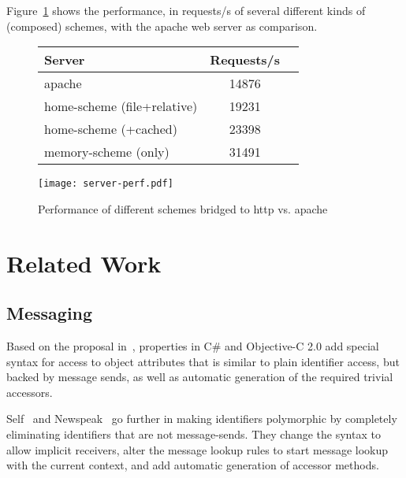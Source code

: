 \documentclass[preprint,authoryear]{llncs}
\begin{document}
Figure~\ref{http-server-speed} shows the performance, in requests/s of several different kinds of (composed)
schemes, with the apache web server as comparison.  

\begin{figure}
\begin{minipage}[c]{0.58\textwidth}
\begin{tabular}{|l|c|c|} \hline
Server   &  Requests/s    \\ \hline
apache & 	14876	      \\ %
home-scheme (file+relative) &  19231   \\ %
home-scheme (+cached)  &  23398  \\ %
memory-scheme (only) &  31491  \\ \hline
\end{tabular}
\end{minipage}
\begin{minipage}[c]{0.58\textwidth}
\texttt{[image: server-perf.pdf]}
\end{minipage}
\caption{Performance of different schemes bridged to http vs. apache}
\label{http-server-speed}
\end{figure}





\section{Related Work}
\label{related-work}

\subsection{Messaging}

Based on the proposal in~\cite{Spinellis:2002:MPC:510857.510868}, properties in C\# and Objective-C 2.0
 add special syntax for access to object attributes 
that is similar to plain identifier access, but backed by message sends, as well as automatic
generation of the required trivial accessors.  

Self~\cite{UngarS87} and Newspeak~\cite{newspeak} go further in making identifiers polymorphic by 
completely eliminating identifiers that are not message-sends.  They change the syntax to allow
implicit receivers, alter the message lookup rules to start message lookup with the
current context, and add automatic generation of accessor methods.  
\end{document}

